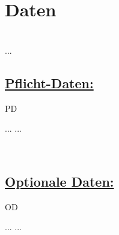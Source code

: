 %
%


\chapter{Daten}
\label{DT}~\\

...
\\

\section*{\underline{Pflicht-Daten:}}

\begin{ids}{\gls{PD}}

	\id[ 1] ...
	\id[10] ...

\end{ids}

~\\

\section*{\underline{Optionale Daten:}}

\begin{ids}{\gls{OD}}

	\id[ 11] ...
	\id[100] ...

\end{ids}









